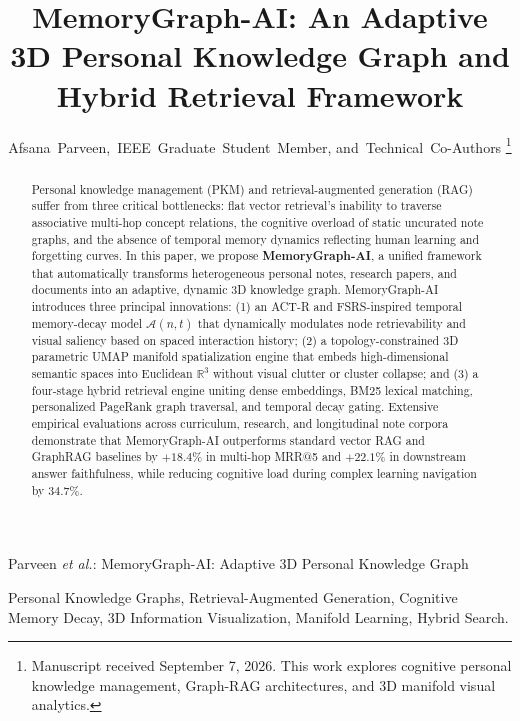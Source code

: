 \documentclass[journal,10pt,twocolumn]{IEEEtran}
\begin{document}
\title{MemoryGraph-AI: An Adaptive 3D Personal Knowledge Graph and Hybrid Retrieval Framework}

\author{Afsana~Parveen,~IEEE~Graduate~Student~Member,
        and~Technical~Co-Authors%
\thanks{Manuscript received September 7, 2026. This work explores cognitive personal knowledge management, Graph-RAG architectures, and 3D manifold visual analytics.}%
}

%
{Parveen \MakeLowercase{\textit{et al.}}: MemoryGraph-AI: Adaptive 3D Personal Knowledge Graph}

\maketitle

\begin{abstract}
Personal knowledge management (PKM) and retrieval-augmented generation (RAG) suffer from three critical bottlenecks: flat vector retrieval's inability to traverse associative multi-hop concept relations, the cognitive overload of static uncurated note graphs, and the absence of temporal memory dynamics reflecting human learning and forgetting curves. In this paper, we propose \textbf{MemoryGraph-AI}, a unified framework that automatically transforms heterogeneous personal notes, research papers, and documents into an adaptive, dynamic 3D knowledge graph. MemoryGraph-AI introduces three principal innovations: (1) an ACT-R and FSRS-inspired temporal memory-decay model $\mathcal{A}(n, t)$ that dynamically modulates node retrievability and visual saliency based on spaced interaction history; (2) a topology-constrained 3D parametric UMAP manifold spatialization engine that embeds high-dimensional semantic spaces into Euclidean $\mathbb{R}^3$ without visual clutter or cluster collapse; and (3) a four-stage hybrid retrieval engine uniting dense embeddings, BM25 lexical matching, personalized PageRank graph traversal, and temporal decay gating. Extensive empirical evaluations across curriculum, research, and longitudinal note corpora demonstrate that MemoryGraph-AI outperforms standard vector RAG and GraphRAG baselines by $+18.4\%$ in multi-hop MRR@5 and $+22.1\%$ in downstream answer faithfulness, while reducing cognitive load during complex learning navigation by $34.7\%$.
\end{abstract}

\begin{IEEEkeywords}
Personal Knowledge Graphs, Retrieval-Augmented Generation, Cognitive Memory Decay, 3D Information Visualization, Manifold Learning, Hybrid Search.
\end{IEEEkeywords}












\end{document}
